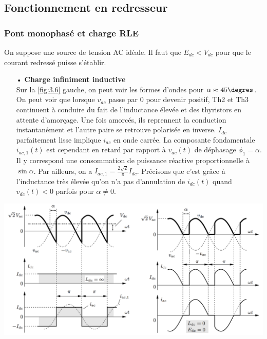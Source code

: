 			\subsection{Fonctionnement en redresseur}
				\subsubsection{Pont monophasé et charge RLE}
					On suppose une source de tension AC idéale. Il faut que $E_{dc} < V_{dc}$ pour que le courant redressé puisse s'établir. \\
					
					\begin{itemize}
					\item[•] \textbf{Charge infiniment inductive}\\
					Sur la \autoref{fig:3.6} gauche, on peut voir les formes d'ondes pour $\alpha \approx 45\degres$. On peut voir que lorsque $v_{ac}$ passe par 0 pour devenir positif, Th2 et Th3 continuent à conduire du fait de l'inductance élevée et des thyristors en attente d'amorçage. Une fois amorcés, ils reprennent la conduction instantanément et l'autre paire se retrouve polarisée en inverse. $I_{dc}$ parfaitement lisse implique $i_{ac}$ en onde carrée. La composante fondamentale $i_{ac,1}(t)$ est cependant en retard par rapport à $v_{ac}(t)$ de déphasage $\phi _1 = \alpha$. Il y correspond une consommation de puissance réactive proportionnelle à $\sin \alpha$. Par ailleurs, on a $I_{ac,1} = \frac{2\sqrt{2}}{\pi}I_{dc}$. Précisons que c'est grâce à l'inductance très élevée qu'on n'a pas d'annulation de $i_{dc}(t)$ quand $v_{dc}(t)<0$ parfois pour $\alpha \neq 0$. 
					\end{itemize}
					
					\begin{center}
					\includegraphics[scale=0.3]{ch3/6}
					\label{fig:3.6}
					\end{center}
					
